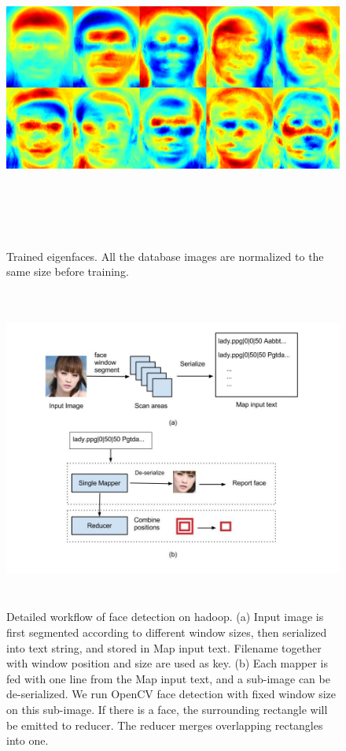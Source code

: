 \documentclass[11pt, draftclsnofoot, onecolumn]{IEEEtran}
\begin{document}
\begin{figure}
\centering
\includegraphics[height=300pt]{eigenfaces}
\caption{Trained eigenfaces. All the database images are normalized to the same size before training.}
\label{fig:eigenfaces}
\end{figure}

\begin{figure}
\centering
\includegraphics[height=300pt]{hadoop_face_detection}
\caption{Detailed workflow of face detection on hadoop. (a) Input image is first segmented according to different window sizes, then serialized into text string, and stored in Map input text. Filename together with window position and size are used as key. (b) Each mapper is fed with one line from the Map input text, and a sub-image can be de-serialized. We run OpenCV face detection with fixed window size on this sub-image. If there is a face, the surrounding rectangle will be emitted to reducer. The reducer merges overlapping rectangles into one.}
\label{fig:hadoop_face_detection}
\end{figure}
\end{document}
